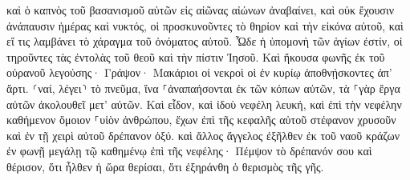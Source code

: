 \documentclass{openreader}
\begin{document}
καὶ ὁ καπνὸς τοῦ βασανισμοῦ αὐτῶν εἰς αἰῶνας αἰώνων ἀναβαίνει, καὶ οὐκ ἔχουσιν ἀνάπαυσιν ἡμέρας καὶ νυκτός, οἱ προσκυνοῦντες τὸ θηρίον καὶ τὴν εἰκόνα αὐτοῦ, καὶ εἴ τις λαμβάνει τὸ χάραγμα τοῦ ὀνόματος αὐτοῦ. 
Ὧδε ἡ ὑπομονὴ τῶν ἁγίων ἐστίν, οἱ τηροῦντες τὰς ἐντολὰς τοῦ θεοῦ καὶ τὴν πίστιν Ἰησοῦ. 
Καὶ ἤκουσα φωνῆς ἐκ τοῦ οὐρανοῦ λεγούσης· Γράψον· Μακάριοι οἱ νεκροὶ οἱ ἐν κυρίῳ ἀποθνῄσκοντες ἀπ’ ἄρτι. ⸂ναί, λέγει⸃ τὸ πνεῦμα, ἵνα ⸀ἀναπαήσονται ἐκ τῶν κόπων αὐτῶν, τὰ ⸀γὰρ ἔργα αὐτῶν ἀκολουθεῖ μετ’ αὐτῶν. 
Καὶ εἶδον, καὶ ἰδοὺ νεφέλη λευκή, καὶ ἐπὶ τὴν νεφέλην καθήμενον ὅμοιον ⸀υἱὸν ἀνθρώπου, ἔχων ἐπὶ τῆς κεφαλῆς αὐτοῦ στέφανον χρυσοῦν καὶ ἐν τῇ χειρὶ αὐτοῦ δρέπανον ὀξύ. 
καὶ ἄλλος ἄγγελος ἐξῆλθεν ἐκ τοῦ ναοῦ κράζων ἐν φωνῇ μεγάλῃ τῷ καθημένῳ ἐπὶ τῆς νεφέλης· Πέμψον τὸ δρέπανόν σου καὶ θέρισον, ὅτι ἦλθεν ἡ ὥρα θερίσαι, ὅτι ἐξηράνθη ὁ θερισμὸς τῆς γῆς. 
\end{document}
